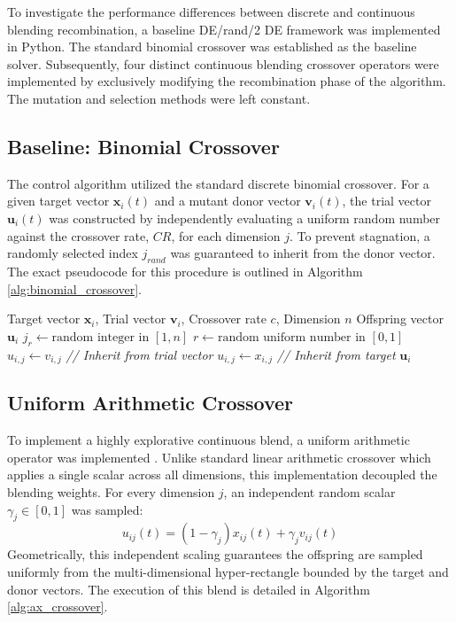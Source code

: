\documentclass[conference]{IEEEtran}
\begin{document}
To investigate the performance differences between discrete and continuous blending recombination, a baseline DE/rand/2 
DE framework was implemented in Python. The standard binomial crossover was established as the 
baseline solver. Subsequently, four distinct continuous blending crossover operators were implemented by exclusively 
modifying the recombination phase of the algorithm. The mutation and selection methods were left constant.

\subsection{Baseline: Binomial Crossover}
The control algorithm utilized the standard discrete binomial crossover. For a given target vector $\mathbf{x}_i(t)$ and 
a mutant donor vector $\mathbf{v}_i(t)$, the trial vector $\mathbf{u}_i(t)$ was constructed by independently evaluating 
a uniform random number against the crossover rate, $CR$, for each dimension $j$. To prevent stagnation, a randomly 
selected index $j_{rand}$ was guaranteed to inherit from the donor vector.
The exact pseudocode for this procedure is outlined in Algorithm \ref{alg:binomial_crossover}.
    
\begin{algorithm}[H]
\caption{Binomial Crossover}
\label{alg:binomial_crossover}
\begin{algorithmic}[1] 
\REQUIRE Target vector $\mathbf{x}_i$, Trial vector $\mathbf{v}_i$, Crossover rate $c$, Dimension $n$
\ENSURE Offspring vector $\mathbf{u}_i$
\STATE $j_{r} \gets \text{random integer in } [1, n]$
    \STATE $r \gets \text{random uniform number in } [0, 1]$
        \STATE $u_{i,j} \gets v_{i,j}$  \textit{ // Inherit from trial vector}
    \ELSE
        \STATE $u_{i,j} \gets x_{i,j}$  \textit{ // Inherit from target}
    \ENDIF
\ENDFOR
\RETURN $\mathbf{u}_i$
\end{algorithmic}
\end{algorithm}
\subsection{Uniform Arithmetic Crossover}
To implement a highly explorative continuous blend, a uniform arithmetic operator was implemented \cite{michalewicz1992}. Unlike standard 
linear arithmetic crossover which applies a single scalar across all dimensions, this implementation decoupled the 
blending weights. For every dimension $j$, an independent random scalar $\gamma_j \in [0, 1]$ was sampled:
\begin{equation}
u_{ij}(t) = (1 - \gamma_j)x_{ij}(t) + \gamma_j v_{ij}(t)
\end{equation}
Geometrically, this independent scaling guarantees the offspring are sampled uniformly from the multi-dimensional hyper-rectangle bounded 
by the target and donor vectors.
The execution of this blend is detailed in Algorithm \ref{alg:ax_crossover}.
\end{document}

